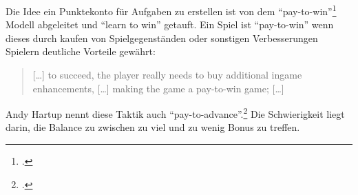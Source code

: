 	Die Idee ein Punktekonto für Aufgaben zu erstellen ist von dem \enquote{pay-to-win}\footcite{pay-to-win} Modell  abgeleitet und \enquote{learn to win} getauft.
	Ein Spiel ist \enquote{pay-to-win} wenn dieses durch kaufen von Spielgegenständen oder sonstigen Verbesserungen Spielern deutliche Vorteile gewährt:
	\begin{quote}
		\vspace{\baselineskip}\hfill\begin{minipage}{0.96\textwidth}
			[\dots] to succeed, the player really needs to buy additional ingame enhancements, [\dots] making the game a pay-to-win game; [\dots]
		\end{minipage}
	\end{quote}
	Andy Hartup nennt diese Taktik auch \enquote{pay-to-advance}.\footcite{free-to-play_is_pay-to-win} Die Schwierigkeit liegt darin, die Balance zu zwischen zu viel und zu wenig Bonus zu treffen.

